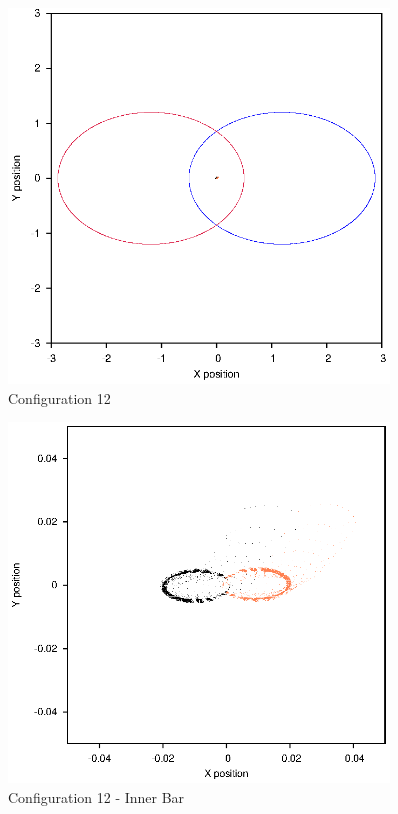 \documentclass[a4paper,12pt]{article}
\begin{document}
\begin{figure}[H]
\centering
\includegraphics[width=0.9\textwidth]{./results/02-75-02-1/Orbit.eps}
\caption{Configuration 12}
\label{fig:config12}
\end{figure}
\begin{figure}[H]
\centering
\includegraphics[width=0.9\textwidth]{./results/02-75-02-1/Inner.eps}
\caption{Configuration 12 - Inner Bar}
\label{fig:config12i}
\end{figure}
\end{document}
